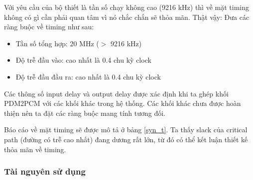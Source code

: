 
Với yêu cầu của bộ thiết là tần số chạy không cao (9216 kHz) thì về mặt timing không có gì cần phải quan tâm vì nó chắc chắn sẽ thỏa mãn. Thật vậy:
Đưa các ràng buộc về timing như sau:
\begin{itemize}
    \item Tần số tổng hợp: 20 MHz ($>$ 9216 kHz)
    \item Độ trễ đầu vào: cao nhất là 0.4 chu kỳ clock
    \item Độ trễ đầu đầu ra: cao nhất là 0.4 chu kỳ clock
\end{itemize}

Các thông số input delay và output delay được xác định khi ta ghép khối PDM2PCM 
với các khối khác trong hệ thống. Các khối khác chưa được hoàn thiện nên ta đặt các ràng buộc mang tính tương đối.

Báo cáo về mặt timing sẽ được mô tả ở bảng \ref{syn_t}. Ta thấy slack của critical path (đường có trễ cao nhất) đang dương rất lớn, từ đó có thể kết luận thiết kế thỏa mãn về timing.
\subsubsection{Tài nguyên sử dụng}

